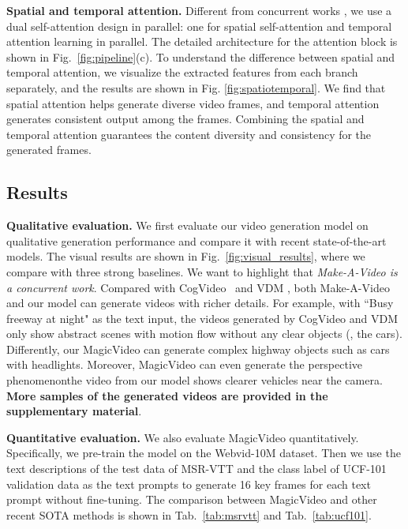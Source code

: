 \documentclass[10pt,twocolumn,letterpaper]{article}
\newcommand{\myPara}[1]{\vspace{6pt}\noindent\textbf{#1}}
\begin{document}
\myPara{Spatial and temporal attention.}
Different from concurrent works \cite{singer_make--video_2022}, we use a dual self-attention design in parallel: one for spatial self-attention and temporal attention learning in parallel. The detailed architecture for the attention block is shown in Fig.~\ref{fig:pipeline}(c). To understand the difference between spatial and temporal attention, we visualize the extracted features from each branch separately, and the results are shown in Fig. \ref{fig:spatiotemporal}. We find that spatial attention helps generate diverse video frames, and temporal attention generates consistent output among the frames. Combining the spatial and temporal attention guarantees the content diversity and consistency for the generated frames.





\subsection{Results}



\myPara{Qualitative evaluation.}
We first evaluate our video generation model on qualitative generation performance and compare it with recent state-of-the-art  models. The visual results are shown in Fig.~\ref{fig:visual_results}, where we compare  with three strong baselines. We want to highlight that \textit{Make-A-Video is a concurrent work}. Compared with CogVideo~\cite{CogVideo} and VDM \cite{ho2022video}, both Make-A-Video and our model can generate videos with richer details. For example, with ``Busy freeway at night" as the text input, the videos generated by CogVideo  and VDM  only show abstract scenes with motion flow without any clear objects (\eg, the cars). Differently,   our MagicVideo can generate complex highway objects such as cars with headlights. Moreover, MagicVideo can even generate the perspective phenomenon\textemdash the video from our model shows clearer vehicles near the camera. \textbf{More samples of the generated videos are provided in the supplementary material}.



\myPara{Quantitative evaluation.}
We also evaluate MagicVideo quantitatively. Specifically, we pre-train  the model   on the Webvid-10M dataset. Then we use the text descriptions of the test data of   MSR-VTT   and the class label of   UCF-101 validation data as the text prompts to generate 16 key frames for each text prompt without fine-tuning. The comparison between MagicVideo and other recent SOTA methods is  shown in   Tab.~\ref{tab:msrvtt} and Tab.~\ref{tab:ucf101}.
\end{document}
